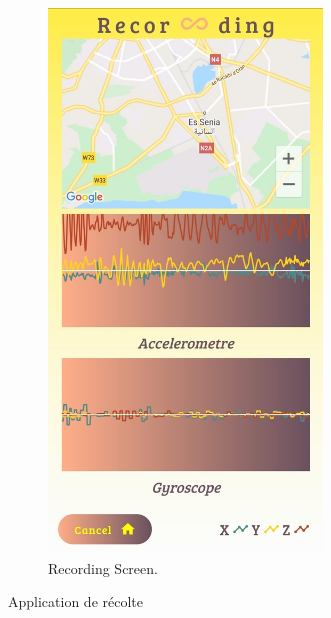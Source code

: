 \begin{itemize}
\begin{figure}[h!]
\begin{subfigure}{.49\textwidth}
            \includegraphics[width=0.8\textwidth]{Images/recordingApp/recordingScreen.jpg}
            \caption{Recording Screen.}
            \label{fig:Recording}
        \end{subfigure}
        \caption{Application de récolte}
        \label{fig:app_recolte}
    \end{figure}


\end{itemize}

